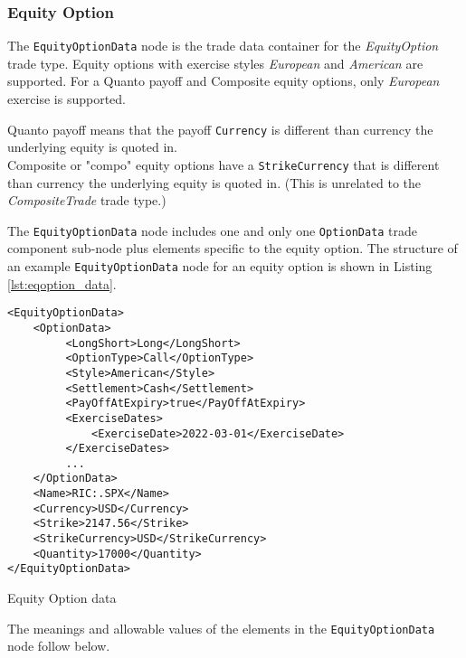 \subsubsection{Equity Option}

The \lstinline!EquityOptionData!  node is the trade data container for the \emph{EquityOption} trade type.  Equity 
options with exercise styles \emph{European} and \emph{American} are supported. For a Quanto payoff and Composite equity options, only \emph{European} exercise is supported. 

Quanto payoff means that the payoff \lstinline!Currency! is different than currency the underlying equity is quoted in. \\
Composite or "compo" equity options have a \lstinline!StrikeCurrency! that is different than currency the underlying equity is quoted in. (This is unrelated to the \emph{CompositeTrade} trade type.)

The \lstinline!EquityOptionData!  node includes one and 
only one \lstinline!OptionData! trade component sub-node plus elements specific to the equity option. The structure of 
an example \lstinline!EquityOptionData! node for an equity option is shown in Listing
\ref{lst:eqoption_data}.

\begin{listing}[H]
\begin{verbatim}
<EquityOptionData>
    <OptionData>
         <LongShort>Long</LongShort>
         <OptionType>Call</OptionType>
         <Style>American</Style>
         <Settlement>Cash</Settlement>
         <PayOffAtExpiry>true</PayOffAtExpiry>
         <ExerciseDates>
             <ExerciseDate>2022-03-01</ExerciseDate>
         </ExerciseDates>
         ...
    </OptionData>
    <Name>RIC:.SPX</Name>
    <Currency>USD</Currency>
    <Strike>2147.56</Strike>
    <StrikeCurrency>USD</StrikeCurrency>
    <Quantity>17000</Quantity>
</EquityOptionData>
\end{verbatim}
\caption{Equity Option data}
\label{lst:eqoption_data}
\end{listing}

The meanings and allowable values of the elements in the \lstinline!EquityOptionData! node follow below.

